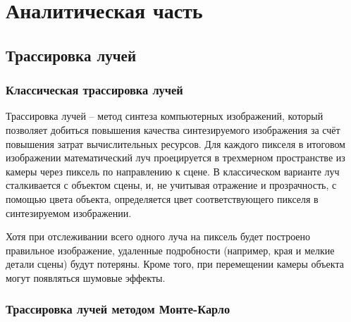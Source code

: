\chapter{Аналитическая часть}

\section{Трассировка лучей}

\subsection{Классическая трассировка лучей}

 


Трассировка лучей -- метод синтеза компьютерных изображений, который позволяет добиться повышения качества синтезируемого изображения за счёт повышения затрат вычислительных ресурсов.
Для каждого пикселя в итоговом изображении математический луч проецируется в трехмерном пространстве из камеры через пиксель по направлению к сцене. В классическом варианте луч сталкивается с объектом сцены, и, не учитывая отражение и прозрачность, с помощью цвета объекта, определяется цвет соответствующего пикселя в синтезируемом изображении.

Хотя при отслеживании всего одного луча на пиксель будет построено правильное изображение, удаленные подробности (например, края и мелкие детали сцены) будут потеряны. Кроме того, при перемещении камеры объекта могут появляться шумовые эффекты.

 
\subsection{Трассировка лучей методом Монте-Карло}

